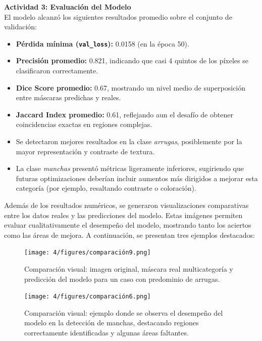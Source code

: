 \textbf{Actividad 3: Evaluación del Modelo} \\
El modelo alcanzó los siguientes resultados promedio sobre el conjunto de validación:
\begin{itemize}
  \item \textbf{Pérdida mínima (\texttt{val\_loss}):} 0.0158 (en la época 50).
  \item \textbf{Precisión promedio:} 0.821, indicando que casi 4 quintos de los píxeles se clasificaron correctamente.
  \item \textbf{Dice Score promedio:} 0.67, mostrando un nivel medio de superposición entre máscaras predichas y reales.
  \item \textbf{Jaccard Index promedio:} 0.61, reflejando aun el desafío de obtener coincidencias exactas en regiones complejas.
  \item Se detectaron mejores resultados en la clase \emph{arrugas}, posiblemente por la mayor representación y contraste de textura.
  \item La clase \emph{manchas} presentó métricas ligeramente inferiores, sugiriendo que futuras optimizaciones deberían incluir aumentos más dirigidos a mejorar esta categoría (por ejemplo, resaltando contraste o coloración).
\end{itemize}

\vspace{0.5cm}

Además de los resultados numéricos, se generaron visualizaciones comparativas entre los datos reales y las predicciones del modelo. Estas imágenes permiten evaluar cualitativamente el desempeño del modelo, mostrando tanto los aciertos como las áreas de mejora. A continuación, se presentan tres ejemplos destacados:

\vspace{0.5cm}

\begin{figure}[H]
\centering
\texttt{[image: 4/figures/comparación9.png]}
\caption{Comparación visual: imagen original, máscara real multicategoría y predicción del modelo para un caso con predominio de arrugas.}
\label{fig:validacion1}
\end{figure}

\begin{figure}[H]
\centering
\texttt{[image: 4/figures/comparación6.png]}
\caption{Comparación visual: ejemplo donde se observa el desempeño del modelo en la detección de manchas, destacando regiones correctamente identificadas y algunas áreas faltantes.}
\label{fig:validacion2}
\end{figure}

